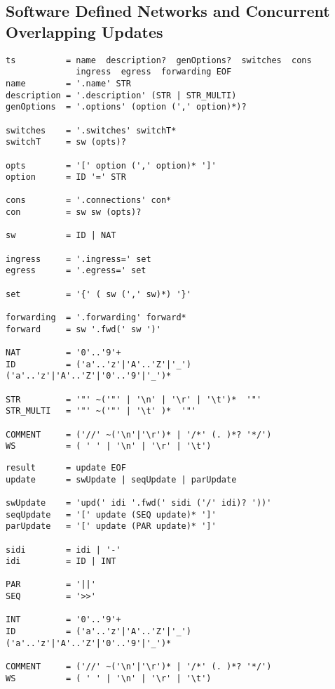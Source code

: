 \documentclass[12pt,twoside,a4paper,openright]{memoir}
\begin{document}
\subsection{Software Defined Networks and Concurrent Overlapping Updates}
\begin{lstlisting}[captionpos=b, caption=Grammar for the Topology and the Initial Configuration of SDNs, label = lst:grammar,language=ebnf]
ts			= name  description?  genOptions?  switches  cons
			  ingress  egress  forwarding EOF
name		= '.name' STR
description	= '.description' (STR | STR_MULTI)
genOptions  = '.options' (option (',' option)*)?

switches	= '.switches' switchT*
switchT		= sw (opts)?

opts		= '[' option (',' option)* ']'
option		= ID '=' STR

cons		= '.connections' con*
con			= sw sw (opts)?

sw			= ID | NAT

ingress     = '.ingress=' set
egress      = '.egress=' set

set         = '{' ( sw (',' sw)*) '}'

forwarding  = '.forwarding' forward*
forward     = sw '.fwd(' sw ')'

NAT         = '0'..'9'+
ID			= ('a'..'z'|'A'..'Z'|'_') ('a'..'z'|'A'..'Z'|'0'..'9'|'_')*

STR			= '"' ~('"' | '\n' | '\r' | '\t')*  '"'
STR_MULTI	= '"' ~('"' | '\t' )*  '"'

COMMENT		= ('//' ~('\n'|'\r')* | '/*' (. )*? '*/')
WS		    = ( ' ' | '\n' | '\r' | '\t')
\end{lstlisting}
\begin{lstlisting}[captionpos=b, caption=Grammar of the Concurrent Overlapping Updates of SDNs, label = lst:grammar,language=ebnf]
result     	= update EOF
update      = swUpdate | seqUpdate | parUpdate

swUpdate    = 'upd(' idi '.fwd(' sidi ('/' idi)? '))'
seqUpdate   = '[' update (SEQ update)* ']'
parUpdate   = '[' update (PAR update)* ']'

sidi		= idi | '-'
idi 		= ID | INT

PAR 		= '||'
SEQ 		= '>>'

INT			= '0'..'9'+
ID  		= ('a'..'z'|'A'..'Z'|'_') ('a'..'z'|'A'..'Z'|'0'..'9'|'_')*

COMMENT		= ('//' ~('\n'|'\r')* | '/*' (. )*? '*/')
WS			= ( ' ' | '\n' | '\r' | '\t')
\end{lstlisting}
\end{document}
